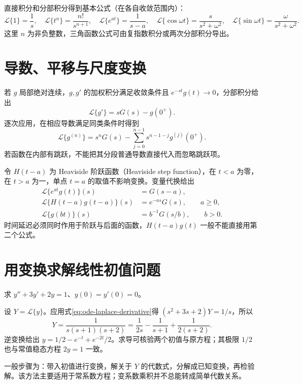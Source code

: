 \documentclass[UTF8,12pt,a4paper,fontset=fandol]{ctexbook}
\begin{document}
直接积分和分部积分得到基本公式（在各自收敛范围内）：
\[
 \mathcal L\{1\}=\frac1s,\quad
 \mathcal L\{t^n\}=\frac{n!}{s^{n+1}},\quad
 \mathcal L\{e^{at}\}=\frac1{s-a},\quad
 \mathcal L\{\cos\omega t\}=\frac{s}{s^2+\omega^2},\quad
 \mathcal L\{\sin\omega t\}=\frac{\omega}{s^2+\omega^2}.
\]
这里 $n$ 为非负整数，三角函数公式可由复指数积分或两次分部积分导出。

\section{导数、平移与尺度变换}
若 $g$ 局部绝对连续，$g,g'$ 的加权积分满足收敛条件且 $e^{-st}g(t)\to0$，分部积分给出
\[
 \mathcal L\{g'\}=sG(s)-g(0^+).
\]
逐次应用，在相应导数满足同类条件时得到
\begin{equation}
 \mathcal L\{g^{(n)}\}=s^nG(s)-\sum_{j=0}^{n-1}s^{n-1-j}g^{(j)}(0^+).
 \label{eq:ode-laplace-derivative}
\end{equation}
若函数在内部有跳跃，不能把其分段普通导数直接代入而忽略跳跃项。

令 $H(t-a)$ 为 Heaviside 阶跃函数（Heaviside step function），在 $t<a$ 为零，在 $t>a$ 为一，单点 $t=a$ 的取值不影响变换。变量代换给出
\begin{align*}
 \mathcal L\{e^{at}g(t)\}(s)&=G(s-a),\\
 \mathcal L\{H(t-a)g(t-a)\}(s)&=e^{-as}G(s),\qquad a\geq0,\\
 \mathcal L\{g(bt)\}(s)&=b^{-1}G(s/b),\qquad b>0.
\end{align*}
时间延迟必须同时作用于阶跃与后面的函数，$H(t-a)g(t)$ 一般不能直接用第二个公式。

\section{用变换求解线性初值问题}
\begin{example}
求 $y''+3y'+2y=1$、$y(0)=y'(0)=0$。
\end{example}
\begin{solve}
设 $Y=\mathcal L\{y\}$。应用式\eqref{eq:ode-laplace-derivative}得 $(s^2+3s+2)Y=1/s$，所以
\[
 Y=\frac{1}{s(s+1)(s+2)}=\frac1{2s}-\frac1{s+1}+\frac1{2(s+2)}.
\]
逆变换给出 $y=1/2-e^{-t}+e^{-2t}/2$。求导可核验两个初值与原方程；其极限 $1/2$ 也与常值稳态方程 $2y=1$ 一致。
\end{solve}

一般步骤为：带入初值进行变换，解关于 $Y$ 的代数式，分解成已知变换，再检验解。该方法主要适用于常系数方程；变系数乘积并不总能转成简单代数关系。
\end{document}

